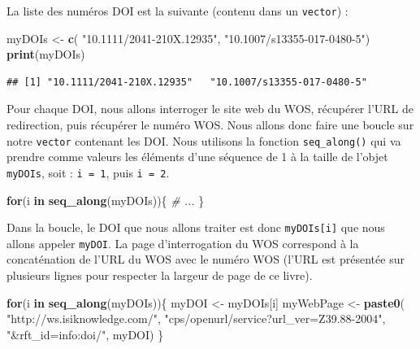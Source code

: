 \documentclass[twoside,symmetric]{book}
\newenvironment{Shaded}{}{}
\newcommand{\CommentTok}[1]{\textit{#1}}
\newcommand{\ControlFlowTok}[1]{\textbf{#1}}
\newcommand{\KeywordTok}[1]{\textbf{#1}}
\newcommand{\NormalTok}[1]{#1}
\newcommand{\StringTok}[1]{#1}
\begin{document}
La liste des numéros DOI est la suivante (contenu dans un \texttt{vector}) :

\begin{Shaded}
\begin{Highlighting}[]
\NormalTok{myDOIs <-}\StringTok{ }\KeywordTok{c}\NormalTok{(}
  \StringTok{"10.1111/2041-210X.12935"}\NormalTok{, }
  \StringTok{"10.1007/s13355-017-0480-5"}\NormalTok{)}
\KeywordTok{print}\NormalTok{(myDOIs)}
\end{Highlighting}
\end{Shaded}

\begin{verbatim}
## [1] "10.1111/2041-210X.12935"   "10.1007/s13355-017-0480-5"
\end{verbatim}

Pour chaque DOI, nous allons interroger le site web du WOS, récupérer l'URL de redirection, puis récupérer le numéro WOS. Nous allons donc faire une boucle sur notre \texttt{vector} contenant les DOI. Nous utilisons la fonction \texttt{seq\_along()} qui va prendre comme valeurs les éléments d'une séquence de 1 à la taille de l'objet \texttt{myDOIs}, soit : \texttt{i\ =\ 1}, puis \texttt{i\ =\ 2}.

\begin{Shaded}
\begin{Highlighting}[]
\ControlFlowTok{for}\NormalTok{(i }\ControlFlowTok{in} \KeywordTok{seq_along}\NormalTok{(myDOIs))\{}
  \CommentTok{# ...}
\NormalTok{\}}
\end{Highlighting}
\end{Shaded}

Dans la boucle, le DOI que nous allons traiter est donc \texttt{myDOIs{[}i{]}} que nous allons appeler \texttt{myDOI}. La page d'interrogation du WOS correspond à la concaténation de l'URL du WOS avec le numéro WOS (l'URL est présentée sur plusieurs lignes pour respecter la largeur de page de ce livre).

\begin{Shaded}
\begin{Highlighting}[]
\ControlFlowTok{for}\NormalTok{(i }\ControlFlowTok{in} \KeywordTok{seq_along}\NormalTok{(myDOIs))\{}
\NormalTok{  myDOI <-}\StringTok{ }\NormalTok{myDOIs[i]}
\NormalTok{  myWebPage <-}\StringTok{ }\KeywordTok{paste0}\NormalTok{(}
    \StringTok{"http://ws.isiknowledge.com/"}\NormalTok{, }
    \StringTok{"cps/openurl/service?url_ver=Z39.88-2004"}\NormalTok{, }
    \StringTok{"&rft_id=info:doi/"}\NormalTok{, myDOI)}
\NormalTok{\}}
\end{Highlighting}
\end{Shaded}
\end{document}
